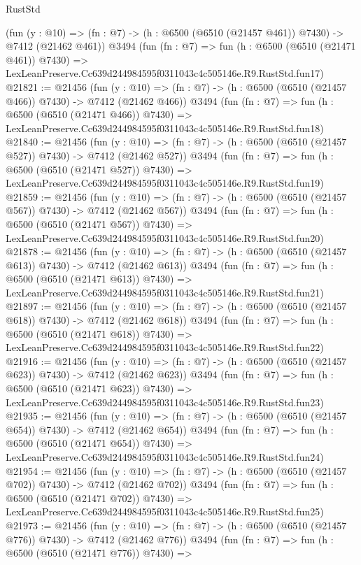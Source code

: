 \begin{lexlean}{RustStd}
\begin{coremodule}
    (fun (y : @10) => (fn : @7) -> (h : @6500 (@6510 (@21457 @461)) @7430) -> @7412 (@21462 @461))
    @3494
    (fun (fn : @7) =>
    fun (h : @6500 (@6510 (@21471 @461)) @7430) =>
    LexLeanPreserve.Cc639d244984595f0311043c4c505146e.R9.RustStd.fun17)
@21821 := @21456
    (fun (y : @10) => (fn : @7) -> (h : @6500 (@6510 (@21457 @466)) @7430) -> @7412 (@21462 @466))
    @3494
    (fun (fn : @7) =>
    fun (h : @6500 (@6510 (@21471 @466)) @7430) =>
    LexLeanPreserve.Cc639d244984595f0311043c4c505146e.R9.RustStd.fun18)
@21840 := @21456
    (fun (y : @10) => (fn : @7) -> (h : @6500 (@6510 (@21457 @527)) @7430) -> @7412 (@21462 @527))
    @3494
    (fun (fn : @7) =>
    fun (h : @6500 (@6510 (@21471 @527)) @7430) =>
    LexLeanPreserve.Cc639d244984595f0311043c4c505146e.R9.RustStd.fun19)
@21859 := @21456
    (fun (y : @10) => (fn : @7) -> (h : @6500 (@6510 (@21457 @567)) @7430) -> @7412 (@21462 @567))
    @3494
    (fun (fn : @7) =>
    fun (h : @6500 (@6510 (@21471 @567)) @7430) =>
    LexLeanPreserve.Cc639d244984595f0311043c4c505146e.R9.RustStd.fun20)
@21878 := @21456
    (fun (y : @10) => (fn : @7) -> (h : @6500 (@6510 (@21457 @613)) @7430) -> @7412 (@21462 @613))
    @3494
    (fun (fn : @7) =>
    fun (h : @6500 (@6510 (@21471 @613)) @7430) =>
    LexLeanPreserve.Cc639d244984595f0311043c4c505146e.R9.RustStd.fun21)
@21897 := @21456
    (fun (y : @10) => (fn : @7) -> (h : @6500 (@6510 (@21457 @618)) @7430) -> @7412 (@21462 @618))
    @3494
    (fun (fn : @7) =>
    fun (h : @6500 (@6510 (@21471 @618)) @7430) =>
    LexLeanPreserve.Cc639d244984595f0311043c4c505146e.R9.RustStd.fun22)
@21916 := @21456
    (fun (y : @10) => (fn : @7) -> (h : @6500 (@6510 (@21457 @623)) @7430) -> @7412 (@21462 @623))
    @3494
    (fun (fn : @7) =>
    fun (h : @6500 (@6510 (@21471 @623)) @7430) =>
    LexLeanPreserve.Cc639d244984595f0311043c4c505146e.R9.RustStd.fun23)
@21935 := @21456
    (fun (y : @10) => (fn : @7) -> (h : @6500 (@6510 (@21457 @654)) @7430) -> @7412 (@21462 @654))
    @3494
    (fun (fn : @7) =>
    fun (h : @6500 (@6510 (@21471 @654)) @7430) =>
    LexLeanPreserve.Cc639d244984595f0311043c4c505146e.R9.RustStd.fun24)
@21954 := @21456
    (fun (y : @10) => (fn : @7) -> (h : @6500 (@6510 (@21457 @702)) @7430) -> @7412 (@21462 @702))
    @3494
    (fun (fn : @7) =>
    fun (h : @6500 (@6510 (@21471 @702)) @7430) =>
    LexLeanPreserve.Cc639d244984595f0311043c4c505146e.R9.RustStd.fun25)
@21973 := @21456
    (fun (y : @10) => (fn : @7) -> (h : @6500 (@6510 (@21457 @776)) @7430) -> @7412 (@21462 @776))
    @3494
    (fun (fn : @7) =>
    fun (h : @6500 (@6510 (@21471 @776)) @7430) =>

\end{coremodule}
\end{lexlean}
